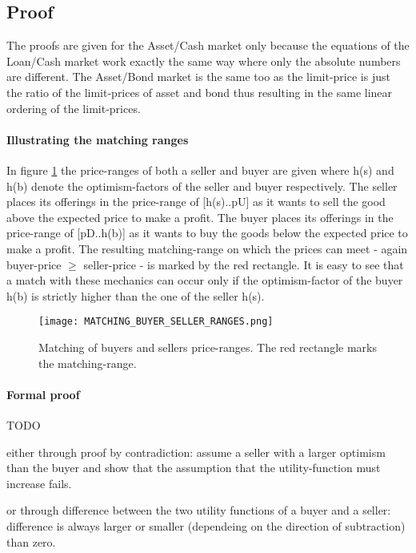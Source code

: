 \documentclass[Bachelorarbeit.tex]{subfiles}
\begin{document}
\subsection{Proof}
The proofs are given for the Asset/Cash market only because the equations of the Loan/Cash market work exactly the same way where only the absolute numbers are different. The Asset/Bond market is the same too as the limit-price is just the ratio of the limit-prices of asset and bond thus resulting in the same linear ordering of the limit-prices.

\paragraph{Illustrating the matching ranges}
In figure \ref{fig:MATCHING_BUYER_SELLER_RANGES} the price-ranges of both a seller and buyer are given where h(s) and h(b) denote the optimism-factors of the seller and buyer respectively. The seller places its offerings in the price-range of [h(s)..pU] as it wants to sell the good above the expected price to make a profit. The buyer places its offerings in the price-range of [pD..h(b)] as it wants to buy the goods below the expected price to make a profit. The resulting matching-range on which the prices can meet - again buyer-price $\geq$ seller-price - is marked by the red rectangle. It is easy to see that a match with these mechanics can occur only if the optimism-factor of the buyer h(b) is strictly higher than the one of the seller h(s).

\begin{figure}[H]
	\centering
  \texttt{[image: MATCHING\_BUYER\_SELLER\_RANGES.png]}
  	\caption{Matching of buyers and sellers price-ranges. The red rectangle marks the matching-range.}
	\label{fig:MATCHING_BUYER_SELLER_RANGES}
\end{figure}

\paragraph{Formal proof}
TODO

either through proof by contradiction: assume a seller with a larger optimism than the buyer and show that the assumption that the utility-function must increase fails.

or through difference between the two utility functions of a buyer and a seller: difference is always larger or smaller (dependeing on the direction of subtraction) than zero.
\end{document}
